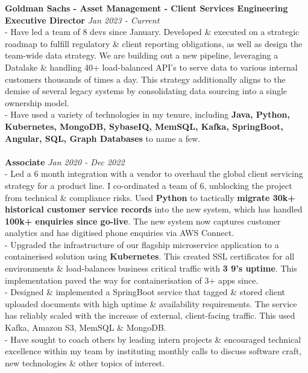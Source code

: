 \documentclass[a4paper,10pt]{article}
\begin{document}
	\textbf{Goldman Sachs - Asset Management - Client Services Engineering}
		\\\textbf{Executive Director}  \hfill \textit{Jan 2023 - Current }
		\\ - Have led a team of 8 devs since January. Developed \& executed on a strategic roadmap to fulfill regulatory \& client reporting obligations, as well as design the team-wide data strategy. We are building out a new pipeline, leveraging a Datalake \& handling 40+ load-balanced API's to serve data to various internal customers thousands of times a day. This strategy additionally aligns to the demise of several legacy systems by consolidating data sourcing into a single ownership model.
		\\ - Have used a variety of technologies in my tenure, including \textbf{Java, Python, Kubernetes, MongoDB, SybaseIQ, MemSQL, Kafka, SpringBoot, Angular, SQL, Graph Databases} to name a few.
		\\\\
		\textbf{Associate}  \hfill \textit{Jan 2020 - Dec 2022}
		\\ - Led a 6 month integration with a vendor to overhaul the global client servicing strategy for a product line. I co-ordinated a team of 6, unblocking the project from technical \& compliance risks. Used \textbf{Python} to tactically \textbf{migrate 30k+ historical customer service records} into the new system, which has handled \textbf{100k+ enquiries since go-live}. The new system now captures customer analytics and has digitised phone enquiries via AWS Connect.
		\\ - Upgraded the infrastructure of our flagship microservice application to a containerised solution using \textbf{Kubernetes}. This created SSL certificates for all environments \& load-balances business critical traffic with \textbf{3 9's uptime}. This implementation paved the way for containerisation of 3+ apps since.
		\\ - Designed \& implemented a SpringBoot service that tagged \& stored client uploaded documents with high uptime \& availability requirements. The service has reliably scaled with the increase of external, client-facing traffic. This used Kafka, Amazon S3, MemSQL \& MongoDB.
		\\ - Have sought to coach others by leading intern projects \& encouraged technical excellence within my team by instituting monthly calls to discuss software craft,  new technologies \& other topics of interest.
		\\\\
\end{document}
